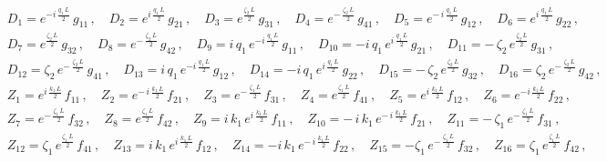 \documentclass[aps,prb,onecolumn,longbibliography,nofootinbib,citeautoscript,10pt]{revtex4-2}
\def \nn{\nonumber \\}
\def\nn{\nonumber \\}
\def \nn{\nonumber \\}
\begin{document}
\begin{align}
& D_1  = e^{- i \, \frac{ q_1 \, L} {2}} \, g_{11}  \, , \quad 
D_2  = e^{ i \, \frac{ q_1 \, L} {2}} \, g_{21}  \, , \quad 
D_3  = e^{  \frac{\zeta_2  \,L} {2}} \, g_{31}  \, , 
\quad D_4  = e^{-  \,  \frac{\zeta_2  \,L} {2}} \, g_{41} \,, \quad
D_5  = e^{- \,i \, \frac{ q_1 \, L} {2}} \, g_{12}  \, , \quad 
D_6  = e^{ i \, \frac{ q_1 \, L} {2}} \, g_{22}  \, , \nn &
 D_7  = e^{  \frac{\zeta_2  \,L} {2}} \, g_{32}  \, , 
 \quad D_8  = e^{- \,  \frac{\zeta_2  \,L} {2}} \, g_{42} \,, \quad
D_9  =  i \, q_1 \,e^{- i \, \frac{ q_1 \, L} {2}} \, g_{11}  \, , \quad 
D_{10}  = - i \, q_1 \, e^{ i \, \frac{ q_1 \, L} {2}} \, g_{21}  \, , \quad 
D_{11}  = - \,\zeta_2 \, e^{  \frac{\zeta_2  \,L} {2}} \, g_{31} \,,  \nn & 
D_{12}  = \zeta_2 \, e^{-  \,  \frac{\zeta_2 \,L} {2}} \, g_{41} \,, \quad
 D_{13}  =  i \, q_1\, e^{- i \, \frac{ q_1 \, L} {2}} \, g_{12}  \, , \quad 
D_{14}  = - i \, q_1 \, e^{ i \, \frac{ q_1 \, L} {2}} \, g_{22}  \, , 
\quad D_{15}  = -\,\zeta_2 \,e^{  \frac{\zeta_2  \,L} {2}} \, g_{32} \,,  
\quad D_{16}  = \zeta_2 \,e^{-\,  \frac{\zeta_2  \,L} {2}} \, g_{42}\,,
\end{align}
\begin{align}
& Z_1  = e^{ i \, \frac{ k_1 \, L} {2}} \, f_{11}  \, , \quad 
Z_2  = e^{- \, i \, \frac{ k_1 \, L} {2}} \, f_{21} \,,  
\quad Z_3  = e^{- \,  \frac{ \zeta_1 \, L} {2}} \, f_{31}  \, , 
\quad Z_4  = e^{  \frac{\zeta_1\, L} {2}} \, f_{41} \,, \quad
Z_5  = e^{ i \, \frac{ k_1 \, L} {2}} \, f_{12}  \, , 
\quad  Z_6  = e^{- i \, \frac{ k_1 \, L} {2}} \, f_{22}  \, , \nn &
Z_7  = e^{- \,  \frac{ \zeta_1 \,L} {2}} \, f_{32}  \, , 
\quad Z_8  = e^{  \frac{ \zeta_1 \, L} {2}} \, f_{42} \,, \quad
Z_9  =  i \, k_1\, e^{ i \, \frac{ k_1 \, L} {2}} \, f_{11}  \, , 
\quad Z_{10}  = - \,i \, k_1 \, e^{-\, i \, \frac{ k_1 \, L} {2}} \, f_{21}  \, , 
\quad Z_{11}  = -\,\zeta_1 \, e^{- \, \frac{\zeta_1 \,L} {2}} \, f_{31}  \, , 
\nn & Z_{12} = \zeta_1 \,e^{\frac{\zeta_1 \,L} {2}} \, f_{41} \,, \quad
Z_{13}  =  i \, k_1 \,e^{ i \, \frac{ k_1 \, L} {2}} \, f_{12} \,,  
\quad Z_{14}  = - i \, k_1 \, e^{- \, i \, \frac{ k_1 \, L} {2}} \, f_{22} \,,  
 \quad Z_{15}  = -\zeta_1 \, e^{- \,  \frac{\zeta_1 \,L} {2}} \, f_{32}  \, , \quad 
 Z_{16}  = \zeta_1 \, e^{\frac{\zeta_1 \,L} {2}} \, f_{42}\,,
\end{align}
\end{document}

